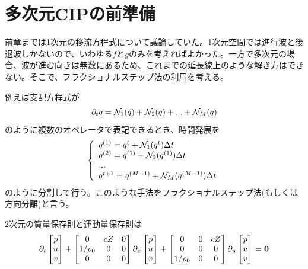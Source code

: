 \documentclass[dvipdfmx, 9pt, a4paper]{jsarticle}
\newcommand{\bm}[1]{{\mbox{\boldmath $#1$}}}
\begin{document}
\section{多次元CIPの前準備}
前章までは1次元の移流方程式について議論していた。1次元空間では進行波と後退波しかないので、いわゆる$f$と$g$のみを考えればよかった。一方で多次元の場合、波が進む向きは無数にあるため、これまでの延長線上のような解き方はできない。そこで、フラクショナルステップ法の利用を考える。\par
例えば支配方程式が
\begin{equation}
\partial_tq=\mathcal{N}_1(q)+\mathcal{N}_2(q)+...+\mathcal{N}_M(q) \notag
\end{equation}
のように複数のオペレータで表記できるとき、時間発展を
\begin{equation}
\left\{
\begin{array}{l}
q^{(1)}=q^t+\mathcal{N}_1(q^t)\Delta t \\
q^{(2)}=q^{(1)}+\mathcal{N}_2(q^{(1)})\Delta t \\
... \\
q^{t+1}=q^{(M-1)}+\mathcal{N}_M(q^{(M-1)})\Delta t \\
\end{array}
\right. \notag
\end{equation}
のように分割して行う。このような手法をフラクショナルステップ法(もしくは方向分離)と言う。\par
2次元の質量保存則と運動量保存則は
\begin{equation}
\partial_t
\begin{bmatrix}
p \\ u \\ v
\end{bmatrix}
+
\begin{bmatrix}
0 & cZ & 0 \\
1/\rho_0 & 0 & 0 \\
0 & 0 & 0 \\ 
\end{bmatrix}
\partial_x
\begin{bmatrix}
p \\ u \\ v
\end{bmatrix}
+
\begin{bmatrix}
0 & 0 & cZ \\
0 & 0 & 0 \\
1/\rho_0 & 0 & 0 \\ 
\end{bmatrix}
\partial_y
\begin{bmatrix}
p \\ u \\ v
\end{bmatrix}=\bm 0 \notag
\end{equation}
\end{document}
